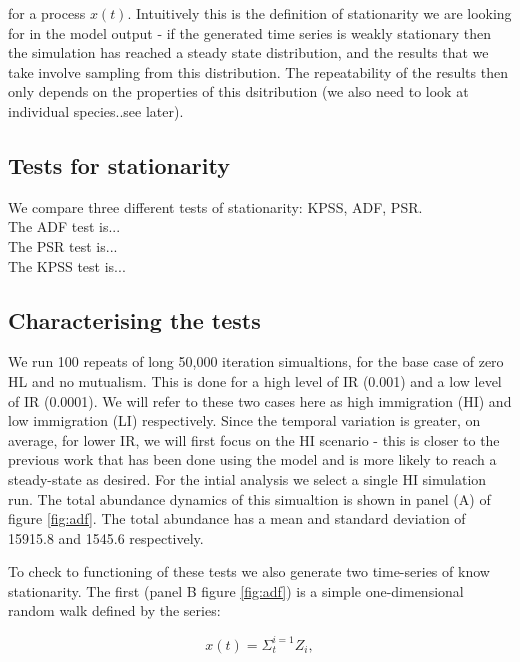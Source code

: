 for a process $x(t)$. Intuitively this is the definition of stationarity we are looking for in the model output - if the generated time series is weakly stationary then the simulation has reached a steady state distribution, and the results that we take involve sampling from this distribution. The repeatability of the results then only depends on the properties of this dsitribution (we also need to look at individual species..see later). 

\subsection{Tests for stationarity}
\label{sec:stat_tests}

We compare three different tests of stationarity: KPSS, ADF, PSR. \\

The ADF test is...\\

The PSR test is...\\

The KPSS test is...\\

\subsection{Characterising the tests}
\label{sec:characterising_stat_tests}


We run 100 repeats of long 50,000 iteration simualtions, for the base case of zero HL and no mutualism. This is done for a high level of IR (0.001) and a low level of IR (0.0001). We will refer to these two cases here as high immigration (HI) and low immigration (LI) respectively. Since the temporal variation is greater, on average, for lower IR, we will first focus on the HI scenario - this is closer to the previous work that has been done using the model and is more likely to reach a steady-state as desired. For the intial analysis we select a single HI simulation run. The total abundance dynamics of this simualtion is shown in panel (A) of figure \ref{fig:adf}. The total abundance has a mean and standard deviation of 15915.8 and 1545.6 respectively. 

To check to functioning of these tests we also generate two time-series of know stationarity. The first (panel B figure \ref{fig:adf}) is a simple one-dimensional random walk defined by the series:

\begin{equation}
	x(t) = \Sigma_{t}^{i=1} Z_i, 
\end{equation}   

